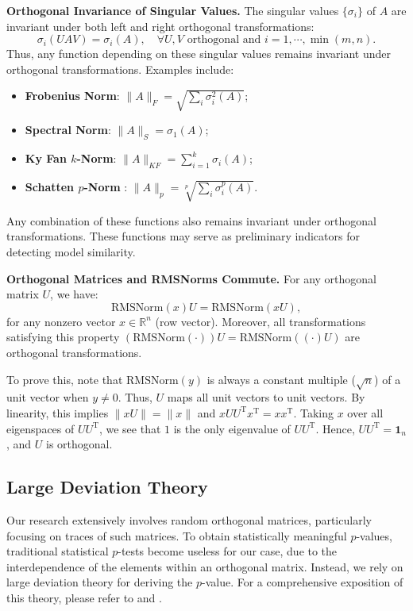 \documentclass{article} %
\newcommand{\R}{\mathbb{R}}
\begin{document}
\textbf{Orthogonal Invariance of Singular Values.} The singular values \(\{\sigma_i\}\) of \(A\) are invariant under both left and right orthogonal transformations:
\[
\sigma_i(UAV) = \sigma_i(A), \quad \forall U, V \text{ orthogonal and } i = 1, \cdots, \min(m,n).
\]
Thus, any function depending on these singular values remains invariant under orthogonal transformations. Examples include:

\begin{itemize}
    \item \textbf{Frobenius Norm}: \( \lVert A \rVert_F = \sqrt{\sum_i \sigma_i^2(A)} \);
    \item \textbf{Spectral Norm}: \( \lVert A \rVert_S = \sigma_1(A) \);
    \item \textbf{Ky Fan $k$-Norm}: \( \lVert A \rVert_{KF} = \sum_{i=1}^k \sigma_i(A) \);
    \item \textbf{Schatten $p$-Norm} \citep{schatten_cross_norms}: \( \lVert A \rVert_p = \sqrt[p]{\sum_i \sigma_i^p(A)} \).
\end{itemize}

Any combination of these functions also remains invariant under orthogonal transformations. These functions may serve as preliminary indicators for detecting model similarity.

\textbf{Orthogonal Matrices and RMSNorms Commute.} For any orthogonal matrix \(U\), we have:
\[
\mathrm{RMSNorm}(x)U = \mathrm{RMSNorm}(x U),
\]
for any nonzero vector \(x \in \R^n\) (row vector). Moreover, all transformations satisfying this property \((\mathrm{RMSNorm}(\cdot))U = \mathrm{RMSNorm}((\cdot)U)\) are orthogonal transformations.

To prove this, note that \(\mathrm{RMSNorm}(y)\) is always a constant multiple (\(\sqrt{n}\)) of a unit vector when \(y \neq 0\).  
Thus, \(U\) maps all unit vectors to unit vectors.  
By linearity, this implies \(\lVert xU \rVert = \lVert x \rVert\) and \(x U U^{\text{T}} x^{\text{T}} = x x^{\text{T}}\).  
Taking \(x\) over all eigenspaces of \(U U^{\text{T}}\), we see that \(1\) is the only eigenvalue of \(U U^{\text{T}}\).  
Hence, \(U U^{\text{T}} = \bm{1}_n\), and \(U\) is orthogonal.


\subsection{Large Deviation Theory}
Our research extensively involves random orthogonal matrices, 
particularly focusing on traces of such matrices. 
To obtain statistically meaningful $p$-values, 
traditional statistical $p$-tests become useless for our case,
due to the interdependence of the elements within an orthogonal matrix. 
Instead, we rely on large deviation theory for deriving the $p$-value.
For a comprehensive exposition of this theory, please refer to \citet{DemboZeitouni1998} and \citet{anderson2010introduction}.
\end{document}
